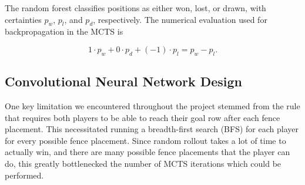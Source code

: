 \documentclass[10pt]{article}
\begin{document}
The random forest classifies positions as either won, lost, or drawn, with certainties $p_w$, $p_l$, and $p_d$, respectively. The numerical evaluation used for backpropagation in the MCTS is 

\begin{equation}
    1 \cdot p_w + 0 \cdot p_d + (-1) \cdot p_l = p_w - p_l.
\end{equation} 

\subsection{Convolutional Neural Network Design}
One key limitation we encountered throughout the project stemmed from the rule that requires both players to be able to reach their goal row after each fence placement. This necessitated running a breadth-first search (BFS) for each player for every possible fence placement. Since random rollout takes a lot of time to actually win, and there are many possible fence placements that the player can do, this greatly bottlenecked the number of MCTS iterations which could be performed.
\end{document}
